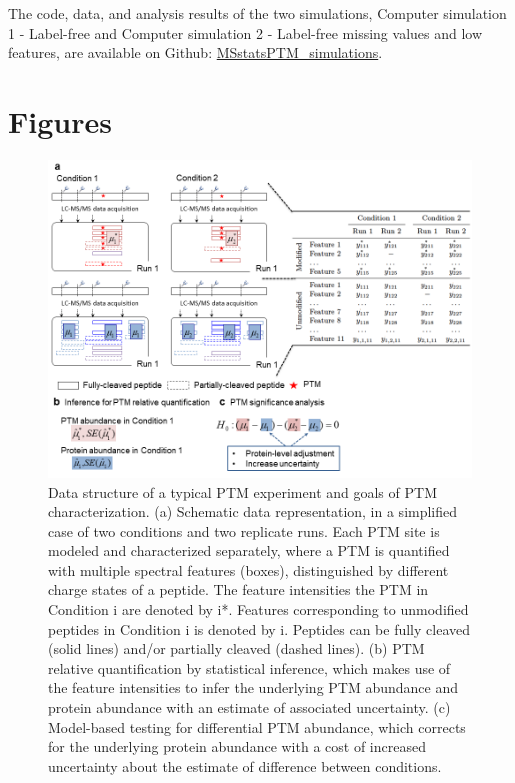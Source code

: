 \documentclass[mcp]{article}
\numberwithin{table}{section}
\begin{document}
The code, data, and analysis results of the two simulations, Computer simulation 1 - Label-free and Computer simulation 2 - Label-free missing values and low features, are available on Github: \href{https://github.com/devonjkohler/MSstatsPTM_simulations}{MSstatsPTM\_simulations}.


\newpage
\printbibliography


\newpage
\section{Figures}

\begin{figure}[ht]
\centering
\includegraphics[scale=.6]{images/fig3.png}
\caption{
Data structure of a typical PTM experiment and goals of PTM characterization. (a) Schematic data representation, in a simplified case of two conditions and two replicate runs. Each PTM site is modeled and characterized separately, where a PTM is quantified with multiple spectral features (boxes), distinguished by different charge states of a peptide. The feature intensities the PTM in Condition i are denoted by i*. Features corresponding to unmodified peptides in Condition i is denoted by i. Peptides can be fully cleaved (solid lines) and/or partially cleaved (dashed lines). (b) PTM relative quantification by statistical inference, which makes use of the feature intensities to infer the underlying PTM abundance and protein abundance with an estimate of associated uncertainty. (c) Model-based testing for differential PTM abundance, which corrects for the underlying protein abundance with a cost of increased uncertainty about the estimate of difference between conditions.}
\label{fig:data-structure}
\end{figure}
\end{document}
